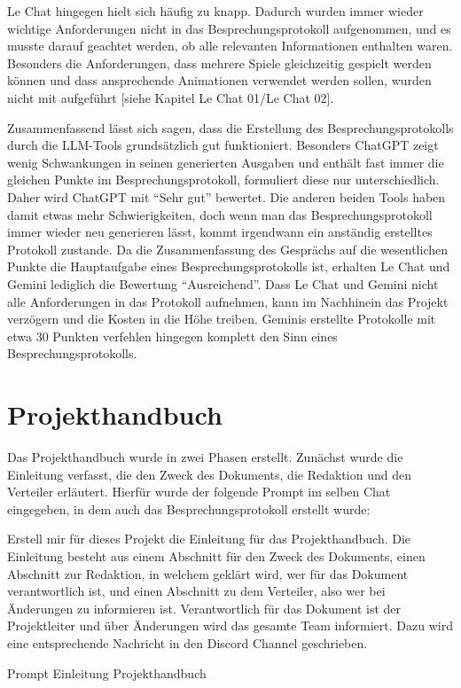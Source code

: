 Le Chat hingegen hielt sich häufig zu knapp. Dadurch wurden immer wieder wichtige Anforderungen nicht in das 
Besprechungsprotokoll aufgenommen, und es musste darauf geachtet werden, ob alle relevanten Informationen enthalten 
waren. Besonders die Anforderungen, dass mehrere Spiele gleichzeitig gespielt werden können und dass ansprechende 
Animationen verwendet werden sollen, wurden nicht mit aufgeführt [siehe Kapitel Le Chat 01/Le Chat 02].

Zusammenfassend lässt sich sagen, dass die Erstellung des Besprechungsprotokolls durch die LLM-Tools grundsätzlich 
gut funktioniert. Besonders ChatGPT zeigt wenig Schwankungen in seinen generierten Ausgaben und enthält fast immer 
die gleichen Punkte im Besprechungsprotokoll, formuliert diese nur unterschiedlich. Daher wird ChatGPT mit 
``Sehr gut'' bewertet. Die anderen beiden Tools haben damit etwas mehr Schwierigkeiten, doch wenn man das 
Besprechungsprotokoll immer wieder neu generieren lässt, kommt irgendwann ein anständig erstelltes Protokoll 
zustande. Da die Zusammenfassung des Gesprächs auf die wesentlichen Punkte die Hauptaufgabe eines Besprechungsprotokolls 
ist, erhalten Le Chat und Gemini lediglich die Bewertung ``Ausreichend''. Dass Le Chat und Gemini nicht alle Anforderungen 
in das Protokoll aufnehmen, kann im Nachhinein das Projekt verzögern und die Kosten in die Höhe treiben. Geminis 
erstellte Protokolle mit etwa 30 Punkten verfehlen hingegen komplett den Sinn eines Besprechungsprotokolls.

\section{Projekthandbuch}  \label{CompProjekthandbuch}

Das Projekthandbuch wurde in zwei Phasen erstellt. Zunächst wurde die Einleitung verfasst, die den Zweck des 
Dokuments, die Redaktion und den Verteiler erläutert. Hierfür wurde der folgende Prompt im selben Chat eingegeben, 
in dem auch das Besprechungsprotokoll erstellt wurde:

\begin{prompt}[H]
    \begin{tcolorbox}[colback=gray!20, colframe=gray!20, boxrule=0pt, sharp corners]
        Erstell mir für dieses Projekt die Einleitung für das Projekthandbuch. Die Einleitung besteht aus einem 
        Abschnitt für den Zweck des Dokuments, einen Abschnitt zur Redaktion, in welchem geklärt wird, wer für das 
        Dokument verantwortlich ist, und einen Abschnitt zu dem Verteiler, also wer bei Änderungen zu informieren ist. 
        Verantwortlich für das Dokument ist der Projektleiter und über Änderungen wird das gesamte Team informiert. 
        Dazu wird eine entsprechende Nachricht in den Discord Channel geschrieben.
        \vfill
    \end{tcolorbox}
    \caption{Prompt Einleitung Projekthandbuch}
    \label{Prompt Einleitung Projekthandbuch}
\end{prompt}

